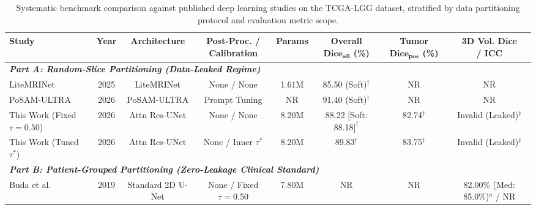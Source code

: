 \documentclass[preprint,12pt,authoryear]{elsarticle}
\begin{document}
\begin{table}[tbp]
\centering
\caption{Systematic benchmark comparison against published deep learning studies on the TCGA-LGG dataset, stratified by data partitioning protocol and evaluation metric scope.}
\label{tab:sota_comparison}
\setlength{\tabcolsep}{0.9pt}
\scriptsize
\begin{tabular*}{\textwidth}{@{\extracolsep{\fill}}lccccccc}
\toprule
\textbf{Study} & \textbf{Year} & \textbf{Architecture} & \shortstack{\textbf{Post-Proc. /} \\ \textbf{Calibration}} & \textbf{Params} & \shortstack{\textbf{Overall} \\ $\mathbf{\text{Dice}_{\text{all}}}$ \textbf{(\%)}} & \shortstack{\textbf{Tumor} \\ $\mathbf{\text{Dice}_{\text{pos}}}$ \textbf{(\%)}} & \shortstack{\textbf{3D Vol. Dice} \\ \textbf{/ ICC}} \\
\midrule
\multicolumn{8}{l}{\textit{\textbf{Part A: Random-Slice Partitioning (Data-Leaked Regime)}}} \\
\shortstack[l]{LiteMRINet \\ \citep{yuan2025enhanced}} & 2025 & LiteMRINet & None / None & 1.61M & \shortstack{85.50 \\ (Soft)$^\dagger$} & NR & NR \\
\shortstack[l]{PoSAM-ULTRA \\ \citep{alhatamleh2026attention}} & 2026 & PoSAM-ULTRA & Prompt Tuning & NR & \shortstack{91.40 \\ (Soft)$^\dagger$} & NR & NR \\
\shortstack[l]{This Work \\ (Fixed $\tau=0.50$)} & 2026 & Attn Res-UNet & None / None & 8.20M & \shortstack{88.22 \\ $[$Soft: 88.18$]^\dagger$} & 82.74$^\dagger$ & \shortstack{Invalid \\ (Leaked)$^\ddagger$} \\
\shortstack[l]{This Work \\ (Tuned $\tau^*$)} & 2026 & Attn Res-UNet & None / Inner $\tau^*$ & 8.20M & 89.83$^\dagger$ & 83.75$^\dagger$ & \shortstack{Invalid \\ (Leaked)$^\ddagger$} \\
\midrule
\multicolumn{8}{l}{\textit{\textbf{Part B: Patient-Grouped Partitioning (Zero-Leakage Clinical Standard)}}} \\
\shortstack[l]{Buda et al. \\ \citep{buda2019association}} & 2019 & Standard 2D U-Net & None / Fixed $\tau=0.50$ & 7.80M & NR & NR & \shortstack{82.00\% (Med: 85.0\%)$^a$ \\ / NR} \\

\end{tabular*}
\end{table}
\end{document}
